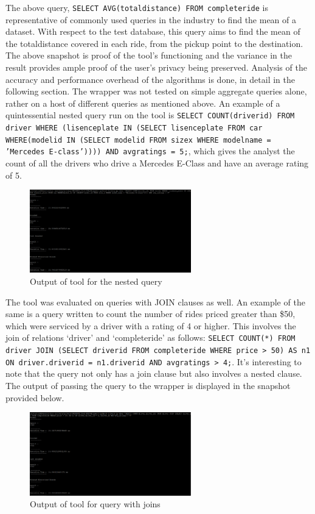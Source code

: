 \documentclass[acmsmall]{acmart}
\begin{document}
The above query, \texttt{SELECT AVG(total\textunderscore distance) FROM completeride} is representative of commonly used queries in the industry to find the mean of a dataset. With respect to the test database, this query aims to find the mean of the total\textunderscore distance covered in each ride, from the pickup point to the destination. The above snapshot is proof of the tool’s functioning and the variance in the result provides ample proof of the user’s privacy being preserved. Analysis of the accuracy and performance overhead of the algorithms is done, in detail in the following section. 
The wrapper was not tested on simple aggregate queries alone, rather on a host of different queries as mentioned above. An example of a quintessential nested query run on the tool is \texttt{SELECT COUNT(driver\textunderscore id) FROM driver WHERE (lisence\textunderscore plate IN (SELECT lisence\textunderscore plate FROM car WHERE(model\textunderscore id IN (SELECT model\textunderscore id FROM size\textunderscore x WHERE model\textunderscore name = 'Mercedes E-class')))) AND avg\textunderscore ratings = 5;}, which gives the analyst the count of all the drivers who drive a Mercedes E-Class and have an average rating of 5.

\begin{figure}[htp]
    \centering
    \includegraphics[width=7cm]{Fig 4.3.2.png}
    \caption{Output of tool for the nested query}
    \label{fig:4.3.2}
\end{figure}

The tool was evaluated on queries with JOIN clauses as well. An example of the same is a query written to count the number of rides priced greater than \$50, which were serviced by a driver with a rating of 4 or higher. This involves the join of relations ‘driver’ and ‘completeride’ as follows: \texttt{SELECT COUNT(*) FROM driver JOIN (SELECT driver\textunderscore id FROM completeride WHERE price > 50) AS n1 ON driver.driver\textunderscore id = n1.driver\textunderscore id AND avg\textunderscore ratings > 4;}. It’s interesting to note that the query not only has a join clause but also involves a nested clause. The output of passing the query to the wrapper is displayed in the snapshot provided below.
\begin{figure}[htp]
    \centering
    \includegraphics[width=7cm]{Fig 4.3.3.png}
    \caption{Output of tool for query with joins}
    \label{fig:4.3.3}
\end{figure}
\end{document}
